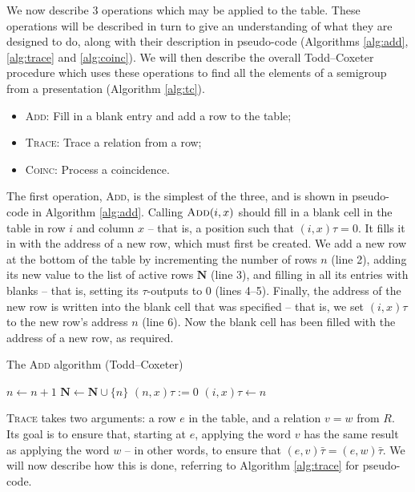 We now describe 3 operations which may be applied to the table.  These
operations will be described in turn to give an understanding of what they are
designed to do, along with their description in pseudo-code
(Algorithms \ref{alg:add}, \ref{alg:trace} and \ref{alg:coinc}).  We will then
describe the overall Todd--Coxeter procedure which uses these operations
to find all the elements of a semigroup from a presentation
(Algorithm \ref{alg:tc}).

\begin{itemize}
\item \textsc{Add}: Fill in a blank entry and add a row to the table;
\item \textsc{Trace}: Trace a relation from a row;
\item \textsc{Coinc}: Process a coincidence.
\end{itemize}

The first operation, \textsc{Add}, is the simplest of the three, and is shown in
pseudo-code in Algorithm \ref{alg:add}.  Calling $\textsc{Add}(i,x)$ should fill
in a blank cell in the table in row $i$ and column $x$ -- that is, a position
such that $(i,x)\tau = 0$.  It fills it in with the address of a new row, which
must first be created.  We add a new row at the bottom of the table by
incrementing the number of rows $n$ (line 2), adding its new value to the list
of active rows $\mathbf{N}$ (line 3), and filling in all its entries with blanks
-- that is, setting its $\tau$-outputs to 0 (lines 4--5).  Finally, the address
of the new row is written into the blank cell that was specified -- that is, we
set $(i,x)\tau$ to the new row's address $n$ (line 6).  Now the blank cell has
been filled with the address of a new row, as required.

\begin{algorithm}
\caption{The \textsc{Add} algorithm (Todd--Coxeter)}
\label{alg:add}
\begin{algorithmic}[1]
\State $n \gets n + 1$
\State $\mathbf{N} \gets \mathbf{N} \cup \{n\}$
  \State $(n, x)\tau := 0$
\EndFor
\State $(i, x)\tau \gets n$
\EndProcedure
\end{algorithmic}
\end{algorithm}

\textsc{Trace} takes two arguments: a row $e$ in the table, and a relation $v=w$
from $R$.  Its goal is to ensure that, starting at $e$, applying the word $v$
has the same result as applying the word $w$ -- in other words, to ensure that
$(e,v)\bar\tau = (e,w)\bar\tau$.  We will now describe how this is done, referring to
Algorithm \ref{alg:trace} for pseudo-code.

